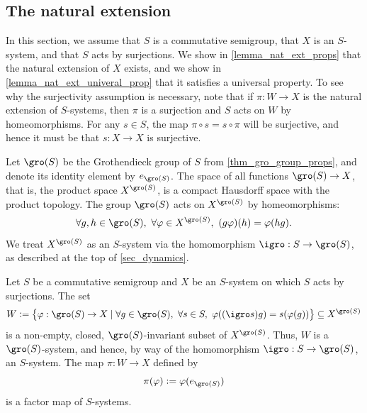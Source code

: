 \subsection{The natural extension}
\label{sec_nat_ext}

In this section, we assume that $S$ is a commutative semigroup, that $X$ is an $S$-system, and that $S$ acts by surjections.  We show in \cref{lemma_nat_ext_props} that the natural extension of $X$ exists, and we show in \cref{lemma_nat_ext_univeral_prop} that it satisfies a universal property.
To see why the surjectivity assumption is necessary, note that if $\pi: W \to X$ is the natural extension of $S$-systems, then $\pi$ is a surjection and $S$ acts on $W$ by homeomorphisms.  For any $s \in S$, the map $\pi \circ s = s \circ \pi$ will be surjective, and hence it must be that $s : X \to X$ is surjective.

Let $\gro(S)$ be the Grothendieck group of $S$ from \cref{thm_gro_group_props}, and denote its identity element by $e_{\gro(S)}$.  The space of all functions $\gro(S) \to X$, that is, the product space $X^{\gro(S)}$, is a compact Hausdorff space with the product topology.  The group $\gro(S)$ acts on $X^{\gro(S)}$ by homeomorphisms:
\[
    \forall g, h \in \gro(S), \ \forall \varphi \in X^{\gro(S)}, \ (g \varphi) (h) = \varphi(hg).
\]
We treat $X^{\gro(S)}$ as an $S$-system via the homomorphism $\igro: S \to \gro(S)$, as described at the top of \cref{sec_dynamics}.


\begin{theorem}
\label{lemma_nat_ext_props}
Let $S$ be a commutative semigroup and $X$ be an $S$-system on which $S$ acts by surjections. The set
\[
    W \defeq \big\{ \varphi: \gro(S) \to X \mid \forall g \in \gro(S), \ \forall s \in S, \ \varphi((\igro s)g) = s (\varphi (g)) \big\} \subseteq X^{\gro(S)}
\]
is a non-empty, closed, $\gro(S)$-invariant subset of $X^{\gro(S)}$. Thus, $W$ is a $\gro(S)$-system, and hence, by way of the homomorphism $\igro: S \to \gro(S)$, an $S$-system. The map $\pi: W \to X$ defined by
\[\pi (\varphi) \defeq \varphi(e_{\gro(S)})\]
is a factor map of $S$-systems.
\end{theorem}

